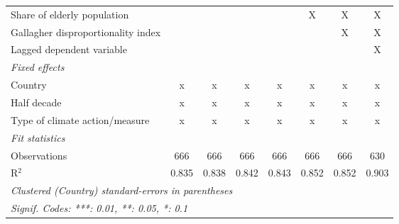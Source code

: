 \begin{tabular}{lccccccc}
   Share of elderly population                                             &                &                &                &                & X              & X              & X\\  
   Gallagher disproportionality index                                      &                &                &                &                &                & X              & X\\  
   Lagged dependent variable                                               &                &                &                &                &                &                & X\\  
   \emph{Fixed effects}\\
   Country                                                                 & x              & x              & x              & x              & x              & x              & x\\  
   Half decade                                                             & x              & x              & x              & x              & x              & x              & x\\  
   Type of climate action/measure                                          & x              & x              & x              & x              & x              & x              & x\\  
   \midrule \emph{Fit statistics}\\
   Observations                                                            & 666            & 666            & 666            & 666            & 666            & 666            & 630\\  
   R$^2$                                                                   & 0.835          & 0.838          & 0.842          & 0.843          & 0.852          & 0.852          & 0.903\\  
   \midrule
   \multicolumn{8}{l}{\emph{Clustered (Country) standard-errors in parentheses}}\\
   \multicolumn{8}{l}{\emph{Signif. Codes: ***: 0.01, **: 0.05, *: 0.1}}\\
\end{tabular}
\par\endgroup



